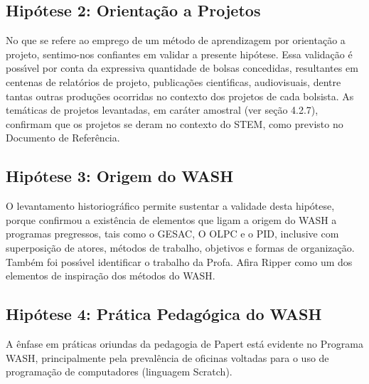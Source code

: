 \documentclass[
12pt,		%
openright,	%
twoside,  %
a4paper,			%
chapter=TITLE,		%
english,			%
french,				%
spanish,			%
brazil				%
]{USPSC-classe/USPSC}
\begin{document}
\subsection[Hip\'otese 2: Orienta\c{c}\~ao a Projetos]{Hip\'otese 2: Orienta\c{c}\~ao a Projetos}\label{Hip\'otese 2: Orienta\c{c}\~ao a Projetos}
No que se refere ao emprego de um m\'etodo de aprendizagem por \textquotedbl orienta\c{c}\~ao a projeto\textquotedbl , sentimo-nos confiantes em validar a presente hip\'otese. Essa valida\c{c}\~ao \'e poss\'{\i}vel por conta da expressiva quantidade de bolsas concedidas, resultantes em centenas de relat\'orios de projeto, publica\c{c}\~oes cient\'{\i}ficas, audiovisuais, dentre tantas outras produ\c{c}\~oes ocorridas no contexto dos projetos de cada bolsista. As tem\'aticas de projetos levantadas, em car\'ater amostral (ver se\c{c}\~ao 4.2.7), confirmam que os projetos se deram no contexto do STEM, como previsto no Documento de Refer\^encia.

















\subsection[Hip\'otese 3: Origem do WASH]{Hip\'otese 3: Origem do WASH}\label{Hip\'otese 3: Origem do WASH}
O levantamento historiogr\'afico permite sustentar a validade desta hip\'otese, porque confirmou a exist\^encia de elementos que ligam a origem do WASH a programas pregressos, tais como o GESAC, O OLPC e o PID, inclusive com superposi\c{c}\~ao de atores, m\'etodos de trabalho, objetivos e formas de organiza\c{c}\~ao. Tamb\'em foi poss\'{\i}vel identificar o trabalho da Profa. Afira Ripper como um dos elementos de inspira\c{c}\~ao dos m\'etodos do WASH.

















\subsection[Hip\'otese 4: Pr\'atica Pedag\'ogica do WASH]{Hip\'otese 4: Pr\'atica Pedag\'ogica do WASH}\label{Hip\'otese 4: Pr\'atica Pedag\'ogica do WASH}
A \^enfase em pr\'aticas oriundas da pedagogia de Papert est\'a evidente no Programa WASH, principalmente pela preval\^encia de oficinas voltadas para o uso de programa\c{c}\~ao de computadores (linguagem Scratch).
\end{document}
